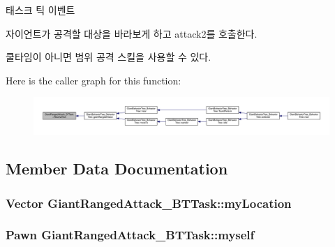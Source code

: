 태스크 틱 이벤트 

자이언트가 공격할 대상을 바라보게 하고 attack2를 호출한다.

쿨타임이 아니면 범위 공격 스킬을 사용할 수 있다. 

Here is the caller graph for this function\+:\nopagebreak
\begin{figure}[H]
\begin{center}
\leavevmode
\includegraphics[width=350pt]{class_giant_ranged_attack___b_t_task_a08873a799a869f1231ce8d57368ecaad_icgraph}
\end{center}
\end{figure}




\subsection{Member Data Documentation}
\subsubsection[{\texorpdfstring{my\+Location}{myLocation}}]{\setlength{\rightskip}{0pt plus 5cm}Vector Giant\+Ranged\+Attack\+\_\+\+B\+T\+Task\+::my\+Location\hspace{0.3cm}{\ttfamily [private]}}\hypertarget{class_giant_ranged_attack___b_t_task_ad94fd43a278b675d241d6bfbea59efbf}{}\label{class_giant_ranged_attack___b_t_task_ad94fd43a278b675d241d6bfbea59efbf}
\subsubsection[{\texorpdfstring{myself}{myself}}]{\setlength{\rightskip}{0pt plus 5cm}Pawn Giant\+Ranged\+Attack\+\_\+\+B\+T\+Task\+::myself\hspace{0.3cm}{\ttfamily [private]}}\hypertarget{class_giant_ranged_attack___b_t_task_a897ee13f9ddeaa6e59a58ac85b7da3db}{}\label{class_giant_ranged_attack___b_t_task_a897ee13f9ddeaa6e59a58ac85b7da3db}
